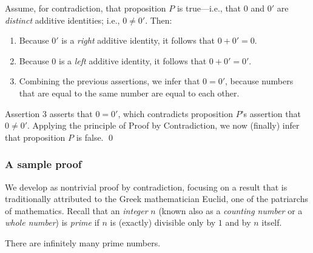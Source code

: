 Assume, for contradiction, that proposition $P$ is true---i.e., that
$0$ and $0'$ are {\em distinct} additive identities; i.e., $0 \neq
0'$.  Then:
\begin{enumerate}
\item
Because $0'$ is a {\em right} additive identity, it follows that $0 +
0' = 0$.
\item
Because $0$ is a {\em left} additive identity, it follows that $0 + 0'
= 0'$.
\item
Combining the previous assertions, we infer that $0 = 0'$, because
numbers that are equal to the same number are equal to each other.
\end{enumerate}
Assertion 3 asserts that $0 = 0'$, which contradicts proposition $P$'s
assertion that $0 \neq 0'$.  Applying the principle of Proof by
Contradiction, we now (finally) infer that proposition $P$ is false. \qed



\subsubsection{A sample proof}
\label{sec:sample-contradictions}

We develop as nontrivial proof by contradiction, focusing on a result
that is traditionally attributed to the Greek mathematician
Euclid, one of the patriarchs of mathematics.  Recall
that an {\it integer} $n$ (known also as a {\it counting number} or a
{\it whole number}) is {\it prime} 
 if $n$ is
(exactly) divisible only by $1$ and by $n$ itself.

\begin{prop}
\label{thm:Primes-infinite}
There are infinitely many prime numbers.
\end{prop}


